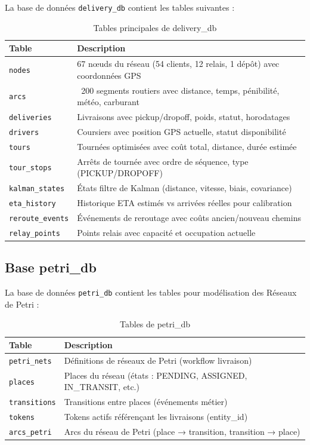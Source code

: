 La base de données \texttt{delivery\_db} contient les tables suivantes :

\begin{table}[h]
\centering
\caption{Tables principales de delivery\_db}
\label{tab:db-schema}
\small
\begin{tabular}{|l|p{10cm}|}
\hline
\textbf{Table} & \textbf{Description} \\
\hline
\texttt{nodes} & 67 nœuds du réseau (54 clients, 12 relais, 1 dépôt) avec coordonnées GPS \\
\hline
\texttt{arcs} & ~200 segments routiers avec distance, temps, pénibilité, météo, carburant \\
\hline
\texttt{deliveries} & Livraisons avec pickup/dropoff, poids, statut, horodatages \\
\hline
\texttt{drivers} & Coursiers avec position GPS actuelle, statut disponibilité \\
\hline
\texttt{tours} & Tournées optimisées avec coût total, distance, durée estimée \\
\hline
\texttt{tour\_stops} & Arrêts de tournée avec ordre de séquence, type (PICKUP/DROPOFF) \\
\hline
\texttt{kalman\_states} & États filtre de Kalman (distance, vitesse, biais, covariance) \\
\hline
\texttt{eta\_history} & Historique ETA estimés vs arrivées réelles pour calibration \\
\hline
\texttt{reroute\_events} & Événements de reroutage avec coûts ancien/nouveau chemins \\
\hline
\texttt{relay\_points} & Points relais avec capacité et occupation actuelle \\
\hline
\end{tabular}
\end{table}

\subsection{Base petri\_db}

La base de données \texttt{petri\_db} contient les tables pour modélisation des Réseaux de Petri :

\begin{table}[h]
\centering
\caption{Tables de petri\_db}
\label{tab:petri-schema}
\begin{tabular}{|l|p{10cm}|}
\hline
\textbf{Table} & \textbf{Description} \\
\hline
\texttt{petri\_nets} & Définitions de réseaux de Petri (workflow livraison) \\
\hline
\texttt{places} & Places du réseau (états : PENDING, ASSIGNED, IN\_TRANSIT, etc.) \\
\hline
\texttt{transitions} & Transitions entre places (événements métier) \\
\hline
\texttt{tokens} & Tokens actifs référençant les livraisons (entity\_id) \\
\hline
\texttt{arcs\_petri} & Arcs du réseau de Petri (place → transition, transition → place) \\
\hline
\end{tabular}
\end{table}

